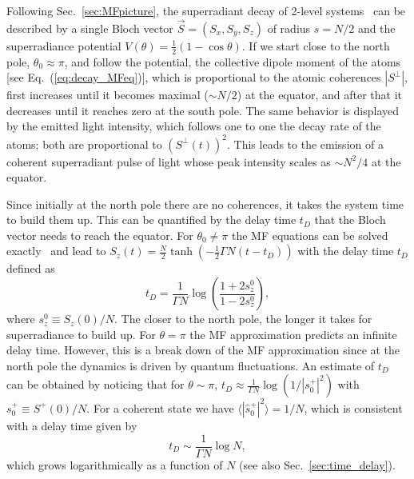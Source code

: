 \documentclass[aps,prx,superscriptaddress,twocolumn,notitlepage,nofootinbib,longbibliography]{revtex4-2}
\begin{document}
Following Sec.~\ref{sec:MFpicture}, the superradiant decay of 2-level systems~\cite{GrossHarocheSuperr} can be described by a single Bloch vector $\vec{S}=(S_x, S_y, S_z)$ of radius $s=N/2$ and the superradiance potential $V(\theta)= \frac{1}{2}(1-\cos\theta)$.
If we start close to the north pole, $\theta_0 \approx \pi$, and follow the potential, the collective dipole moment of the atoms [see Eq.~(\ref{eq:decay_MFeq})], which is proportional to the atomic coherences $|S^\perp|$, first increases until it becomes maximal ($\sim N/2$) at the equator, and after that it decreases until it reaches zero at the south pole. The same behavior is displayed by  the emitted light intensity, which follows one to one the decay rate of the atoms; both are proportional to $({S}^\perp(t))^2$.  This leads to the emission of a coherent superradiant pulse of light whose peak intensity scales as $\sim N^2/4$ at the equator.



Since initially at the north pole there are no coherences, it takes the system   time to build them up.
This can be quantified by the delay time $t_D$ that the Bloch vector needs to reach the equator.
For $\theta_0 \neq \pi$ the MF equations can be solved exactly~\cite{GrossHarocheSuperr} and lead to $S_z(t) = \frac{N}{2} \tanh \left( - \frac{1}{2} \Gamma N(t-t_D) \right)$ with the delay time $t_D$ defined as
\begin{equation}
	t_D= \frac{1}{\Gamma N} \log \left( \frac{1+ 2 s_z^0}{1- 2 s_z^0} \right),
\label{eq:tD_2level}
\end{equation}
where $s_z^0 \equiv S_z(0)/N$.
The closer to the north pole, the longer it takes for superradiance to build up.
For $\theta= \pi$ the MF approximation predicts an infinite delay time. However, this is a  break down of the MF approximation  since at the north pole  the dynamics is driven by quantum fluctuations. An estimate of $t_D $ can be obtained by noticing that for $\theta\sim \pi$,  $t_D\approx \frac{1}{\Gamma N} \log (1/|s^+_0|^2)$ with $s^+_0\equiv S^+(0)/N$. For a coherent state we have $\langle |\hat{s}^+_0|^2\rangle =1/N$, which is consistent with a delay time given by \cite{GrossHarocheSuperr}
\begin{equation}
	t_D \sim \frac{1}{\Gamma N} \log N,
\label{eq:tD_2level_northpole}
\end{equation}
which grows logarithmically as a function of $N$ (see also Sec.~\ref{sec:time_delay}). 
\end{document}
